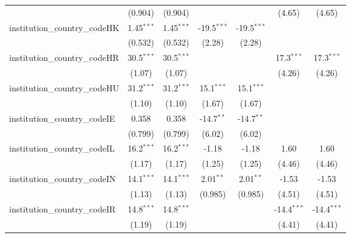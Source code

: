 \begin{tabular}{lcccccc}
                                         & (0.904)       & (0.904)       &               &               & (4.65)        & (4.65)\\   
   institution\_country\_codeHK          & 1.45$^{***}$  & 1.45$^{***}$  & -19.5$^{***}$ & -19.5$^{***}$ &               &   \\   
                                         & (0.532)       & (0.532)       & (2.28)        & (2.28)        &               &   \\   
   institution\_country\_codeHR          & 30.5$^{***}$  & 30.5$^{***}$  &               &               & 17.3$^{***}$  & 17.3$^{***}$\\   
                                         & (1.07)        & (1.07)        &               &               & (4.26)        & (4.26)\\   
   institution\_country\_codeHU          & 31.2$^{***}$  & 31.2$^{***}$  & 15.1$^{***}$  & 15.1$^{***}$  &               &   \\   
                                         & (1.10)        & (1.10)        & (1.67)        & (1.67)        &               &   \\   
   institution\_country\_codeIE          & 0.358         & 0.358         & -14.7$^{**}$  & -14.7$^{**}$  &               &   \\   
                                         & (0.799)       & (0.799)       & (6.02)        & (6.02)        &               &   \\   
   institution\_country\_codeIL          & 16.2$^{***}$  & 16.2$^{***}$  & -1.18         & -1.18         & 1.60          & 1.60\\   
                                         & (1.17)        & (1.17)        & (1.25)        & (1.25)        & (4.46)        & (4.46)\\   
   institution\_country\_codeIN          & 14.1$^{***}$  & 14.1$^{***}$  & 2.01$^{**}$   & 2.01$^{**}$   & -1.53         & -1.53\\   
                                         & (1.13)        & (1.13)        & (0.985)       & (0.985)       & (4.51)        & (4.51)\\   
   institution\_country\_codeIR          & 14.8$^{***}$  & 14.8$^{***}$  &               &               & -14.4$^{***}$ & -14.4$^{***}$\\   
                                         & (1.19)        & (1.19)        &               &               & (4.41)        & (4.41)\\   

\end{tabular}
